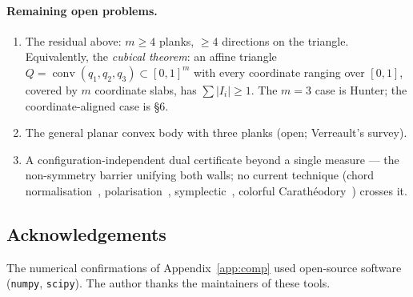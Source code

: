 \documentclass[11pt]{article}
\theoremstyle{plain}
\theoremstyle{remark}
\begin{document}
\paragraph{Remaining open problems.}
\begin{enumerate}
\item The residual above: $m\ge4$ planks, $\ge4$ directions on the triangle.
Equivalently, the \emph{cubical theorem}: an affine triangle
$Q=\operatorname{conv}(q_1,q_2,q_3)\subset[0,1]^m$ with every coordinate ranging
over $[0,1]$, covered by $m$ coordinate slabs, has $\sum|I_i|\ge1$. The $m=3$ case
is Hunter; the coordinate-aligned case is \S6.
\item The general planar convex body with three planks (open; Verreault's survey).
\item A configuration-independent dual certificate beyond a single measure --- the
non-symmetry barrier unifying both walls; no current technique (chord
normalisation~\cite{by2026}, polarisation~\cite{gkp2023}, symplectic~\cite{akp2019},
colorful Carath\'eodory~\cite{ambrus2023}) crosses it.
\end{enumerate}

\subsection*{Acknowledgements}
The numerical confirmations of Appendix~\ref{app:comp} used open-source software
(\texttt{numpy}, \texttt{scipy}). The author thanks the maintainers of these tools.

\appendix
\end{document}
